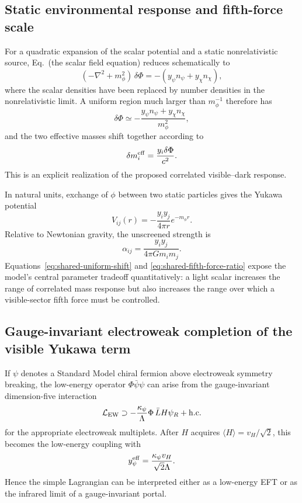 \documentclass[11pt]{article}
\theoremstyle{remark}
\begin{document}
\subsection{Static environmental response and fifth-force scale}
For a quadratic expansion of the scalar potential and a static nonrelativistic source, Eq.~(the scalar field equation) reduces schematically to
\begin{equation}
 (-\nabla^2+m_\phi^2)\,\delta\Phi
 =-\left(y_\psi n_\psi+y_\chi n_\chi\right),
 \label{eq:shared-yukawa-poisson}
\end{equation}
where the scalar densities have been replaced by number densities in the nonrelativistic limit. A uniform region much larger than $m_\phi^{-1}$ therefore has
\begin{equation}
 \delta\Phi
 \simeq-\frac{y_\psi n_\psi+y_\chi n_\chi}{m_\phi^2},
 \label{eq:shared-uniform-shift}
\end{equation}
and the two effective masses shift together according to
\begin{equation}
 \delta m_i^{\rm eff}=\frac{y_i\delta\Phi}{c^2}.
 \label{eq:shared-correlated-mass-shift}
\end{equation}
This is an explicit realization of the proposed correlated visible--dark response.

In natural units, exchange of $\phi$ between two static particles gives the Yukawa potential
\begin{equation}
 V_{ij}(r)=-\frac{y_i y_j}{4\pi r}e^{-m_\phi r}.
 \label{eq:shared-yukawa-potential}
\end{equation}
Relative to Newtonian gravity, the unscreened strength is
\begin{equation}
 \alpha_{ij}=\frac{y_i y_j}{4\pi Gm_i m_j}.
 \label{eq:shared-fifth-force-ratio}
\end{equation}
Equations~\eqref{eq:shared-uniform-shift} and \eqref{eq:shared-fifth-force-ratio} expose the model's central parameter tradeoff quantitatively: a light scalar increases the range of correlated mass response but also increases the range over which a visible-sector fifth force must be controlled.

\subsection{Gauge-invariant electroweak completion of the visible Yukawa term}
If $\psi$ denotes a Standard Model chiral fermion above electroweak symmetry breaking, the low-energy operator $\Phi\bar\psi\psi$ can arise from the gauge-invariant dimension-five interaction
\begin{equation}
 \mathcal L_{\rm EW}
 \supset-\frac{\kappa_\psi}{\Lambda}
 \Phi\,\bar L H\psi_R+\mathrm{h.c.}
 \label{eq:shared-ew-completion}
\end{equation}
for the appropriate electroweak multiplets. After $H$ acquires $\langle H\rangle=v_H/\sqrt2$, this becomes the low-energy coupling with
\begin{equation}
 y_\psi^{\rm eff}=\frac{\kappa_\psi v_H}{\sqrt2\Lambda}.
\end{equation}
Hence the simple Lagrangian can be interpreted either as a low-energy EFT or as the infrared limit of a gauge-invariant portal.
\end{document}
